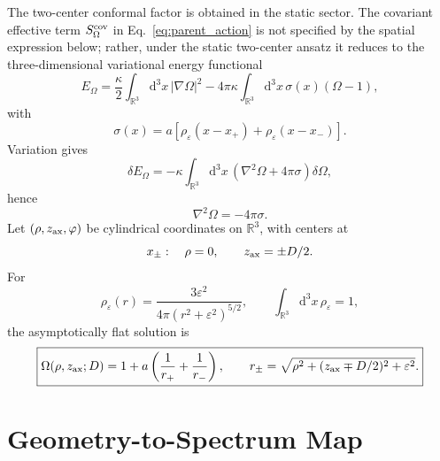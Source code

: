 \documentclass[aps,prd,preprint,notitlepage,nofootinbib,superscriptaddress,floatfix]{revtex4-2}
\newcommand{\dd}{\mathrm{d}}
\theoremstyle{remark}
\begin{document}
The two-center conformal factor is obtained in the static sector.
The covariant effective term \(S_\Omega^{\rm cov}\) in Eq.~\eqref{eq:parent_action} is not specified by the spatial expression below; rather, under the static two-center ansatz it reduces to the three-dimensional variational energy functional
\begin{equation}
E_\Omega
=
\frac{\kappa}{2}
\int_{\mathbb R^3}\dd^3x\,|\nabla\Omega|^2
-4\pi\kappa
\int_{\mathbb R^3}\dd^3x\,\sigma(x)(\Omega-1),
\label{eq:E_Omega}
\end{equation}
with
\begin{equation}
\sigma(x)
=
a\left[\rho_\varepsilon(x-x_+)+\rho_\varepsilon(x-x_-)\right].
\label{eq:sigma}
\end{equation}
Variation gives
\begin{equation}
\delta E_\Omega
=
-\kappa
\int_{\mathbb R^3}\dd^3x\,
\left(\nabla^2\Omega+4\pi\sigma\right)\delta\Omega,
\end{equation}
hence
\begin{equation}
\boxed{
\nabla^2\Omega=-4\pi\sigma.
}
\label{eq:Poisson}
\end{equation}
Let \((\rho,z_{\rm ax},\varphi)\) be cylindrical coordinates on \(\mathbb R^3\), with centers at
\begin{equation}
x_\pm:\quad \rho=0,\qquad z_{\rm ax}=\pm D/2.
\end{equation}
For
\begin{equation}
\rho_\varepsilon(r)
=
\frac{3\varepsilon^2}{4\pi(r^2+\varepsilon^2)^{5/2}},
\qquad
\int_{\mathbb R^3}\dd^3x\,\rho_\varepsilon=1,
\end{equation}
the asymptotically flat solution is
\begin{equation}
\boxed{
\Omega(\rho,z_{\rm ax};D)
=
1+a\left(\frac1{r_+}+\frac1{r_-}\right),
\qquad
r_\pm
=
\sqrt{\rho^2+(z_{\rm ax}\mp D/2)^2+\varepsilon^2}.
}
\label{eq:Omega_solution}
\end{equation}

\section{Geometry-to-Spectrum Map}
\label{sec:geometry_spectrum}
\end{document}
